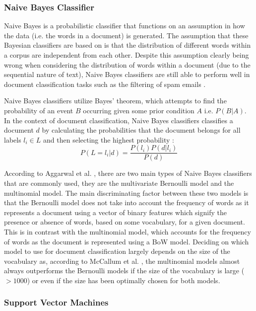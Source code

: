 \documentclass[a4paper,twoside,phd]{BYUPhys}
\begin{document}
\subsubsection{Naive Bayes Classifier}
\label{sec:NaiveBayes}

Naive Bayes is a probabilistic classifier that functions on an assumption in how the data (i.e. the words in a document) is generated. The assumption that these Bayesian classifiers are based on is that the distribution of different words within a corpus are independent from each other. Despite this assumption clearly being wrong when considering the distribution of words within a document (due to the sequential nature of text), Naive Bayes classifiers are still able to perform well in document classification tasks such as the filtering of spam emails \cite{Sahami}.

Naive Bayes classifiers utilize Bayes' theorem, which attempts to find the probability of an event $B$ occurring given some prior condition $A$ i.e. $P(B| A)$. In the context of document classification, Naive Bayes classifiers classifies a document $d$ by calculating the probabilities that the document belongs for all labels $l_i \in L$ and then selecting the highest probability \cite{Allahyari2017}:
\begin{equation}
P(L = l_i| d) = \frac{P(l_i)P(d| l_i)}{P(d)}
\end{equation}

According to Aggarwal et al. \cite{Aggarwal2012}, there are two main types of Naive Bayes classifiers that are commonly used, they are the multivariate Bernoulli model and the multinomial model. The main discriminating factor between these two models is that the Bernoulli model does not take into account the frequency of words as it represents a document using a vector of binary features which signify the presence or absence of words, based on some vocabulary, for a given document. This is in contrast with the multinomial model, which accounts for the frequency of words as the document is represented using a BoW model. Deciding on which model to use for document classification largely depends on the size of the vocabulary as, according to McCallum et al. \cite{McCallum1998}, the multinomial models almost always outperforms the Bernoulli models if the size of the vocabulary is large ($> 1000$) or even if the size has been optimally chosen for both models.

\subsubsection{Support Vector Machines}
\label{sec:SVM}
\end{document}
